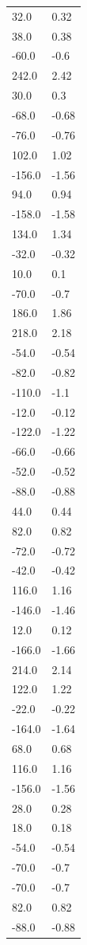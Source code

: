 \begin{longtable}{ll}
32.0 & 0.32 \\
38.0 & 0.38 \\
-60.0 & -0.6 \\
242.0 & 2.42 \\
30.0 & 0.3 \\
-68.0 & -0.68 \\
-76.0 & -0.76 \\
102.0 & 1.02 \\
-156.0 & -1.56 \\
94.0 & 0.94 \\
-158.0 & -1.58 \\
134.0 & 1.34 \\
-32.0 & -0.32 \\
10.0 & 0.1 \\
-70.0 & -0.7 \\
186.0 & 1.86 \\
218.0 & 2.18 \\
-54.0 & -0.54 \\
-82.0 & -0.82 \\
-110.0 & -1.1 \\
-12.0 & -0.12 \\
-122.0 & -1.22 \\
-66.0 & -0.66 \\
-52.0 & -0.52 \\
-88.0 & -0.88 \\
44.0 & 0.44 \\
82.0 & 0.82 \\
-72.0 & -0.72 \\
-42.0 & -0.42 \\
116.0 & 1.16 \\
-146.0 & -1.46 \\
12.0 & 0.12 \\
-166.0 & -1.66 \\
214.0 & 2.14 \\
122.0 & 1.22 \\
-22.0 & -0.22 \\
-164.0 & -1.64 \\
68.0 & 0.68 \\
116.0 & 1.16 \\
-156.0 & -1.56 \\
28.0 & 0.28 \\
18.0 & 0.18 \\
-54.0 & -0.54 \\
-70.0 & -0.7 \\
-70.0 & -0.7 \\
82.0 & 0.82 \\
-88.0 & -0.88 \\

\end{longtable}
